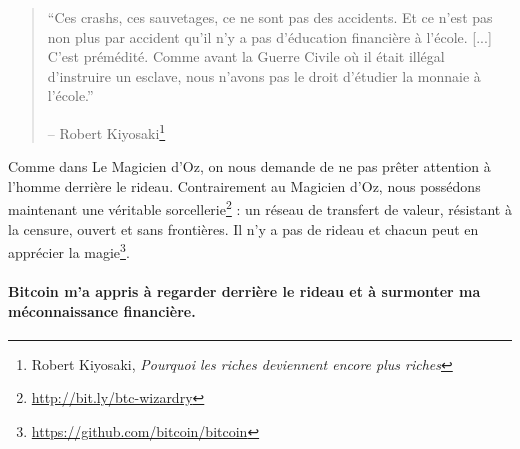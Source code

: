 \begin{quotation}\begin{samepage}
\enquote{Ces crashs, ces sauvetages, ce ne sont pas des accidents. Et ce n'est 
pas non plus par accident qu'il n'y a pas d'éducation financière à l'école.
[...] C'est prémédité. Comme avant la Guerre Civile où il était illégal
d'instruire un esclave, nous n'avons pas le droit d'étudier la monnaie à
l'école.}
\begin{flushright} -- Robert Kiyosaki\footnote{Robert Kiyosaki, \textit{Pourquoi
les riches deviennent encore plus riches}\cite{robert-kiyosaki}}
\end{flushright}\end{samepage}\end{quotation}

Comme dans Le Magicien d'Oz, on nous demande de ne pas prêter attention à
l'homme derrière le rideau. Contrairement au Magicien d'Oz, nous possédons
maintenant une véritable
sorcellerie\footnote{\url{http://bit.ly/btc-wizardry}} : un réseau de transfert
de valeur, résistant à la censure, ouvert et sans frontières. Il n'y a pas de
rideau et chacun peut en apprécier la
magie\footnote{\url{https://github.com/bitcoin/bitcoin}}.

\paragraph{Bitcoin m'a appris à regarder derrière le rideau et à surmonter ma
méconnaissance financière.}

%
%
%
%
